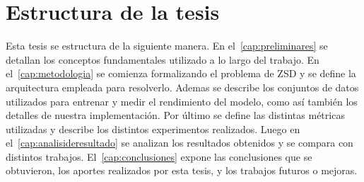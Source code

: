 \section{Estructura de la tesis} \label{sec:estructuradelatesis}

Esta tesis se estructura de la siguiente manera. En el~\autoref{cap:preliminares} se detallan los conceptos fundamentales utilizado a lo largo del trabajo. En el~\autoref{cap:metodologia} se comienza formalizando el problema de ZSD y se define la arquitectura empleada para resolverlo. Ademas se describe los conjuntos de datos utilizados para entrenar y medir el rendimiento del modelo, como así también los detalles de nuestra implementación. Por último se define las distintas métricas utilizadas y describe los distintos experimentos realizados. Luego en el~\autoref{cap:analisideresultado} se analizan los resultados obtenidos y se compara con distintos trabajos. El~\autoref{cap:conclusiones} expone las conclusiones que se obtuvieron, los aportes realizados por esta tesis, y los trabajos futuros o mejoras.

